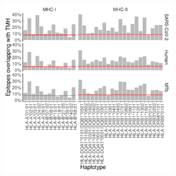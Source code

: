 \begin{figure}
  \centering
  \begin{subfigure}[t]{0.9\textwidth}
    \centering
    \caption{}
    \includegraphics[width=\linewidth]{bbbq_1_smart_results/fig_f_tmh_2_panel.png}
    \label{fig:bbbq_1_smart_results}
  \end{subfigure}

  \vfill


\end{figure}
